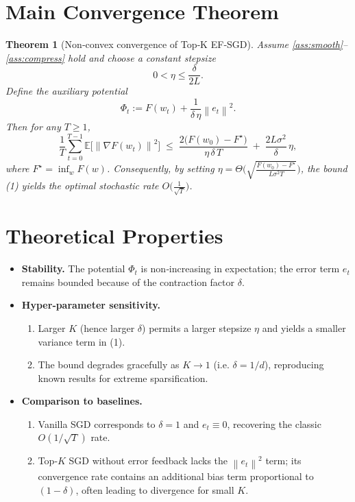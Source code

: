 \documentclass{article}
\newtheorem{theorem}{Theorem}
\newcommand{\E}{\mathbb{E}}
\newcommand{\norm}[1]{\left\lVert #1 \right\rVert}
\begin{document}
\section*{Main Convergence Theorem}
\begin{theorem}[Non‑convex convergence of Top‑K EF‑SGD]\label{thm:main}
Assume \ref{ass:smooth}–\ref{ass:compress} hold and choose a constant stepsize
\[
0<\eta\le\frac{\delta}{2L}.
\]
Define the auxiliary potential
\[
\Phi_t:=F(w_t)+\frac{1}{\delta\,\eta}\norm{e_t}^2 .
\]
Then for any $T\ge1$,
\[
\frac{1}{T}\sum_{t=0}^{T-1}\E\!\big[\norm{\nabla F(w_t)}^2\big]
\;\le\;
\frac{2\big(F(w_0)-F^\star\big)}{\eta\,\delta\,T}
\;+\;
\frac{2L\sigma^2}{\delta}\,\eta ,
\tag{1}
\]
where $F^\star=\inf_{w}F(w)$.
Consequently, by setting $\eta = \Theta\!\big(\sqrt{\frac{F(w_0)-F^\star}{L\sigma^2 T}}\big)$,
the bound (1) yields the optimal stochastic rate $O\!\big(\frac{1}{\sqrt{T}}\big)$.
\end{theorem}

\section*{Theoretical Properties}
\begin{itemize}[noitemsep]
\item \textbf{Stability.} The potential $\Phi_t$ is non‑increasing in expectation; the error term $e_t$ remains bounded because of the contraction factor $\delta$.
\item \textbf{Hyper‑parameter sensitivity.}
    \begin{enumerate}[noitemsep]
    \item Larger $K$ (hence larger $\delta$) permits a larger stepsize $\eta$ and yields a smaller variance term in (1).
    \item The bound degrades gracefully as $K\to1$ (i.e. $\delta=1/d$), reproducing known results for extreme sparsification.
    \end{enumerate}
\item \textbf{Comparison to baselines.}
    \begin{enumerate}[noitemsep]
    \item Vanilla SGD corresponds to $\delta=1$ and $e_t\equiv0$, recovering the classic $O(1/\sqrt{T})$ rate.
    \item Top‑$K$ SGD without error feedback lacks the $\norm{e_t}^2$ term; its convergence rate contains an additional bias term proportional to $(1-\delta)$, often leading to divergence for small $K$.
    \end{enumerate}
\end{itemize}
\end{document}
